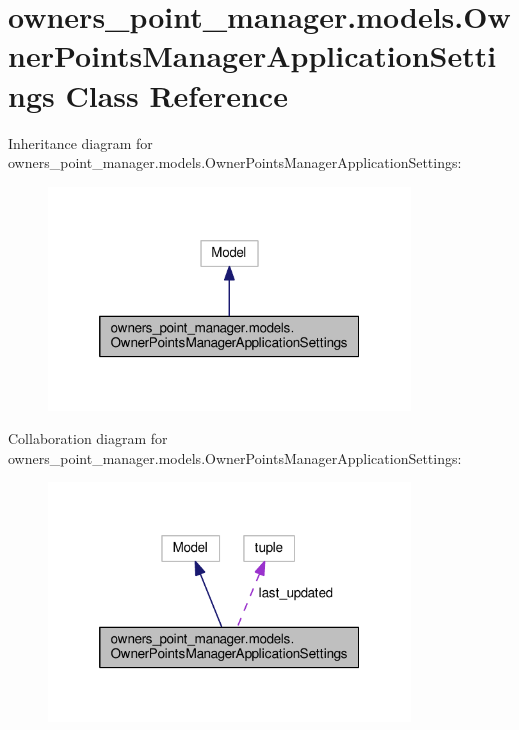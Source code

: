 \hypertarget{classowners__point__manager_1_1models_1_1OwnerPointsManagerApplicationSettings}{\section{owners\-\_\-point\-\_\-manager.\-models.\-Owner\-Points\-Manager\-Application\-Settings Class Reference}
\label{classowners__point__manager_1_1models_1_1OwnerPointsManagerApplicationSettings}
}


Inheritance diagram for owners\-\_\-point\-\_\-manager.\-models.\-Owner\-Points\-Manager\-Application\-Settings\-:
\nopagebreak
\begin{figure}[H]
\begin{center}
\leavevmode
\includegraphics[width=272pt]{classowners__point__manager_1_1models_1_1OwnerPointsManagerApplicationSettings__inherit__graph}
\end{center}
\end{figure}


Collaboration diagram for owners\-\_\-point\-\_\-manager.\-models.\-Owner\-Points\-Manager\-Application\-Settings\-:
\nopagebreak
\begin{figure}[H]
\begin{center}
\leavevmode
\includegraphics[width=272pt]{classowners__point__manager_1_1models_1_1OwnerPointsManagerApplicationSettings__coll__graph}
\end{center}
\end{figure}
